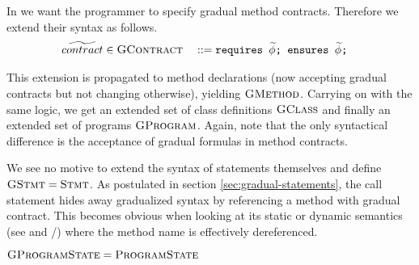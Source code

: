 In \gvlidf we want the programmer to specify gradual method contracts.
Therefore we extend their syntax as follows.
\begin{align*}
\widetilde{contract} & \in \textup{\textsc{GContract}}   &  & ::= \textup{\texttt{requires $\widetilde{\phi}$;~ensures $\widetilde{\phi}$;}}
\end{align*}

This extension is propagated to method declarations (now accepting gradual contracts but not changing otherwise), yielding $\textup{\textsc{GMethod}}$.
Carrying on with the same logic, we get an extended set of class definitions $\textup{\textsc{GClass}}$ and finally an extended set of programs $\textup{\textsc{GProgram}}$.
Again, note that the only syntactical difference is the acceptance of gradual formulas in method contracts.

We see no motive to extend the syntax of statements themselves and define $\textup{\textsc{GStmt}} = \textup{\textsc{Stmt}}$.
As postulated in section \ref{sec:gradual-statements}, the call statement hides away gradualized syntax by referencing a method with gradual contract.
This becomes obvious when looking at its static or dynamic semantics (see  and /) where the method name is effectively dereferenced.




$\textup{\textsc{GProgramState}} = \textup{\textsc{ProgramState}}$